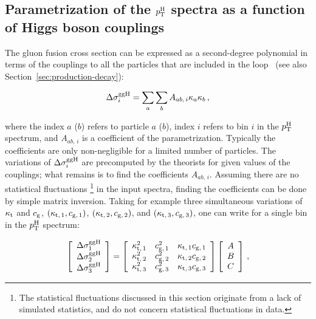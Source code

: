 \subsection{Parametrization of the \texorpdfstring{$p_\mathrm{T}^\mathrm{H}$}{pTH} spectra as a function of Higgs boson couplings}


The gluon fusion cross section can be expressed as a second-degree polynomial in terms of the couplings to all the particles that are included in the loop~\cite{higgshunter} (see also Section~\ref{sec:production-decay}):
% 
\begin{linenomath*}
\begin{equation}
\label{eq:kappa-parametrization}
\Delta\sigma^{\mathrm{g}\mathrm{g}\mathrm{H}}_i = \sum_a \sum_b A_{ab,\,i} \kappa_a \kappa_b 
\,,
\end{equation}
\end{linenomath*}
% 
where the index $a$ ($b$) refers to particle $a$ ($b$), index $i$ refers to bin $i$ in the $p_\mathrm{T}^\mathrm{H}$ spectrum, and $A_{ab,\,i}$ is a coefficient of the parametrization.
% 
Typically the coefficients are only non-negligible for a limited number of particles.
% 
The variations of $\Delta\sigma^{\mathrm{g}\mathrm{g}\mathrm{H}}_i$ are precomputed by the theorists for given values of the couplings; what remains is to find the coefficients $A_{ab,\,i}$.
% 
Assuming there are no statistical fluctuations%
%
\footnote{%
The statistical fluctuations discussed in this section originate from a lack of simulated statistics, and do not concern statistical fluctuations in data.
}
%
in the input spectra, finding the coefficients can be done by simple matrix inversion.
% 
Taking for example three simultaneous variations of $\kappa_{\mathrm{t}}$ and $c_\mathrm{g}$, $(\kappa_{\mathrm{t},\,1}, c_{\mathrm{g},\,1})$, $(\kappa_{\mathrm{t},\,2}, c_{\mathrm{g},\,2})$, and $(\kappa_{\mathrm{t},\,3}, c_{\mathrm{g},\,3})$, one can write for a single bin in the $p_\mathrm{T}^\mathrm{H}$ spectrum:
% 
\begin{linenomath*}
\begin{equation}
\left[\begin{array}{c}
\Delta\sigma_1^{\mathrm{g}\mathrm{g}\mathrm{H}} \\
\Delta\sigma_2^{\mathrm{g}\mathrm{g}\mathrm{H}} \\
\Delta\sigma_3^{\mathrm{g}\mathrm{g}\mathrm{H}}
\end{array}\right]
    =
    \left[\begin{array}{ccc}
        \kappa_{\mathrm{t},\,1}^2  &  c_{\mathrm{g},\,1}^2   &  \kappa_{\mathrm{t},\,1} c_{\mathrm{g},\,1} \\
        \kappa_{\mathrm{t},\,2}^2  &  c_{\mathrm{g},\,2}^2   &  \kappa_{\mathrm{t},\,2} c_{\mathrm{g},\,2} \\
        \kappa_{\mathrm{t},\,3}^2  &  c_{\mathrm{g},\,3}^2   &  \kappa_{\mathrm{t},\,3} c_{\mathrm{g},\,3}
        \end{array}\right]
    \left[\begin{array}{c}
        A \\
        B \\
        C
        \end{array}\right]
    \,,
\end{equation}
\end{linenomath*}
